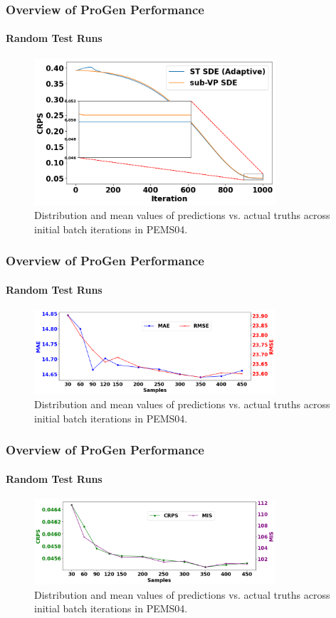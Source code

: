 \documentclass[light]{lutbeamer} %
\begin{document}
\begin{frame}
    \frametitle{Overview of ProGen Performance}
    \framesubtitle{Random Test Runs}

    \begin{figure}[ht]
        \centering
        \includegraphics[width=0.8\textwidth]{figures/crps_stsde_subvpsde.png        }
        \caption{Distribution and mean values of predictions vs. actual truths across initial batch iterations in PEMS04.}
    \end{figure}
\end{frame}

\begin{frame}
    \frametitle{Overview of ProGen Performance}
    \framesubtitle{Random Test Runs}

    \begin{figure}[ht]
        \centering
        \includegraphics[width=0.8\textwidth]{figures/mae_rmse_samples.png       }
        \caption{Distribution and mean values of predictions vs. actual truths across initial batch iterations in PEMS04.}
    \end{figure}
\end{frame}

\begin{frame}
    \frametitle{Overview of ProGen Performance}
    \framesubtitle{Random Test Runs}

    \begin{figure}[ht]
        \centering
        \includegraphics[width=0.8\textwidth]{figures/crps_mis_samples.png        }
        \caption{Distribution and mean values of predictions vs. actual truths across initial batch iterations in PEMS04.}
    \end{figure}
\end{frame}
\end{document}
